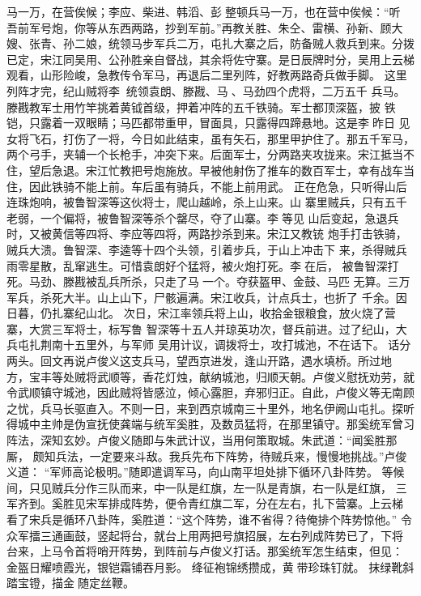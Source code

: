马一万，在营俟候；李应、柴进、韩滔、彭整顿兵马一万，也在营中俟候：“听
吾前军号炮，你等从东西两路，抄到军前。”再教关胜、朱仝、雷横、孙新、顾大
嫂、张青、孙二娘，统领马步军兵二万，屯扎大寨之后，防备贼人救兵到来。分拨
已定，宋江同吴用、公孙胜亲自督战，其余将佐守寨。是日辰牌时分，吴用上云梯
观看，山形险峻，急教传令军马，再退后二里列阵，好教两路奇兵做手脚。
这里列阵才完，纪山贼将李，统领袁朗、滕戡、马、马劲四个虎将，二万五千
兵马。滕戡教军士用竹竿挑着黄钺首级，押着冲阵的五千铁骑。军士都顶深盔，披
铁铠，只露着一双眼睛；马匹都带重甲，冒面具，只露得四蹄悬地。这是李昨日
见女将飞石，打伤了一将，今日如此结束，虽有矢石，那里甲护住了。那五千军马，
两个弓手，夹辅一个长枪手，冲突下来。后面军士，分两路夹攻拢来。宋江抵当不
住，望后急退。宋江忙教把号炮施放。早被他射伤了推车的数百军士，幸有战车当
住，因此铁骑不能上前。车后虽有骑兵，不能上前用武。
正在危急，只听得山后连珠炮响，被鲁智深等这伙将士，爬山越岭，杀上山来。山
寨里贼兵，只有五千老弱，一个偏将，被鲁智深等杀个罄尽，夺了山寨。李等见
山后变起，急退兵时，又被黄信等四将、李应等四将，两路抄杀到来。宋江又教铳
炮手打击铁骑，贼兵大溃。鲁智深、李逵等十四个头领，引着步兵，于山上冲击下
来，杀得贼兵雨零星散，乱窜逃生。可惜袁朗好个猛将，被火炮打死。李在后，
被鲁智深打死。马劲、滕戡被乱兵所杀，只走了马一个。夺获盔甲、金鼓、马匹
无算。三万军兵，杀死大半。山上山下，尸骸遍满。宋江收兵，计点兵士，也折了
千余。因日暮，仍扎寨纪山北。
次日，宋江率领兵将上山，收拾金银粮食，放火烧了营寨，大赏三军将士，标写鲁
智深等十五人并琼英功次，督兵前进。过了纪山，大兵屯扎荆南十五里外，与军师
吴用计议，调拨将士，攻打城池，不在话下。
话分两头。回文再说卢俊义这支兵马，望西京进发，逢山开路，遇水填桥。所过地
方，宝丰等处贼将武顺等，香花灯烛，献纳城池，归顺天朝。卢俊义慰抚劝劳，就
令武顺镇守城池，因此贼将皆感泣，倾心露胆，弃邪归正。自此，卢俊义等无南顾
之忧，兵马长驱直入。不则一日，来到西京城南三十里外，地名伊阙山屯扎。探听
得城中主帅是伪宣抚使龚端与统军奚胜，及数员猛将，在那里镇守。那奚统军曾习
阵法，深知玄妙。卢俊义随即与朱武计议，当用何策取城。朱武道：“闻奚胜那厮，
颇知兵法，一定要来斗敌。我兵先布下阵势，待贼兵来，慢慢地挑战。”卢俊义道：
“军师高论极明。”随即遣调军马，向山南平坦处排下循环八卦阵势。
等候间，只见贼兵分作三队而来，中一队是红旗，左一队是青旗，右一队是红旗，
三军齐到。奚胜见宋军排成阵势，便令青红旗二军，分在左右，扎下营寨。上云梯
看了宋兵是循环八卦阵，奚胜道：“这个阵势，谁不省得？待俺排个阵势惊他。”
令众军擂三通画鼓，竖起将台，就台上用两把号旗招展，左右列成阵势已了，下将
台来，上马令首将哨开阵势，到阵前与卢俊义打话。那奚统军怎生结束，但见：
金盔日耀喷霞光，银铠霜铺吞月影。
绛征袍锦绣攒成，黄带珍珠钉就。
抹绿靴斜踏宝镫，描金随定丝鞭。
